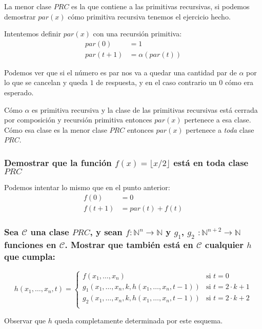 \documentclass[fleqn, 11pt]{article}
\newcommand{\nat}{\mathbb{N}}
\newcommand{\Ccur}{\mathcal{C}}
\begin{document}
La menor clase $PRC$ es la que contiene a las primitivas recursivas, si podemos
demostrar $par(x)$ cómo primitiva recursiva tenemos el ejercicio hecho.

Intentemos definir $par(x)$ con una recursión primitiva:
\begin{align*}
	par(0)     &= 1 \\
	par(t + 1) &= \alpha(par(t))
\end{align*}

Podemos ver que si el número es par nos va a quedar una cantidad par de
$\alpha$ por lo que se cancelan y queda $1$ de respuesta, y en el caso
contrario un $0$ cómo era esperado.

Cómo $\alpha$ es primitiva recursiva y la clase de las primitivas recursivas
está cerrada por composición y recursión primitiva entonces $par(x)$ pertenece
a esa clase. Cómo esa clase es la menor clase $PRC$ entonces $par(x)$ pertenece
a \emph{toda} clase $PRC$.

\subsubsection{Demostrar que la función $f(x) = \lfloor x / 2 \rfloor$ está en
toda clase $PRC$}

Podemos intentar lo mismo que en el punto anterior:
\begin{align*}
	f(0)     &= 0 \\
	f(t + 1) &= par(t) + f(t)
\end{align*}

\subsubsection{Sea $\Ccur$ una clase $PRC$, y sean $f: \nat^n \to \nat$ y
$g_1$, $g_2$ $: \nat^{n+2} \to \nat$ funciones en $\Ccur$. Mostrar que también
está en $\Ccur$ cualquier $h$ que cumpla:}

\[
	h(x_1, \dots, x_n, t) =
	\begin{cases}
		f(x_1, \dots, x_n)
			& \text{si } t = 0 \\
		g_1(x_1, \dots, x_n, k, h(x_1, \dots, x_n, t - 1))
			& \text{si } t = 2 \cdot k + 1 \\
		g_2(x_1, \dots, x_n, k, h(x_1, \dots, x_n, t - 1))
			& \text{si } t = 2 \cdot k + 2 \\
	\end{cases}
\]

Observar que $h$ queda completamente determinada por este esquema.
\end{document}
